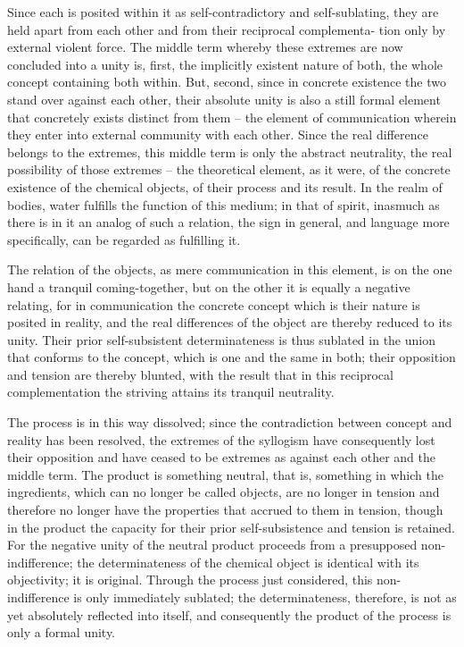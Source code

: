 Since each is posited within it as self-contradictory and self-sublating,
they are held apart from each other and from their reciprocal complementa-
tion only by external violent force. The middle term whereby these extremes
are now concluded into a unity is, first, the implicitly existent nature of both,
the whole concept containing both within. But, second, since in concrete
existence the two stand over against each other, their absolute unity is also a
still formal element that concretely exists distinct from them – the element
of communication wherein they enter into external community with each
other. Since the real difference belongs to the extremes, this middle term
is only the abstract neutrality, the real possibility of those extremes – the
theoretical element, as it were, of the concrete existence of the chemical
objects, of their process and its result. In the realm of bodies, water fulfills
the function of this medium; in that of spirit, inasmuch as there is in it an
analog of such a relation, the sign in general, and language more specifically,
can be regarded as fulfilling it.

The relation of the objects, as mere communication in this element, is
on the one hand a tranquil coming-together, but on the other it is equally
a negative relating, for in communication the concrete concept which is
their nature is posited in reality, and the real differences of the object are
thereby reduced to its unity. Their prior self-subsistent determinateness
is thus sublated in the union that conforms to the concept, which is one
and the same in both; their opposition and tension are thereby blunted,
with the result that in this reciprocal complementation the striving attains
its tranquil neutrality.

The process is in this way dissolved; since the contradiction between
concept and reality has been resolved, the extremes of the syllogism have
consequently lost their opposition and have ceased to be extremes as against
each other and the middle term. The product is something neutral, that
is, something in which the ingredients, which can no longer be called
objects, are no longer in tension and therefore no longer have the properties
that accrued to them in tension, though in the product the capacity for
their prior self-subsistence and tension is retained. For the negative unity
of the neutral product proceeds from a presupposed non-indifference; the
determinateness of the chemical object is identical with its objectivity; it
is original. Through the process just considered, this non-indifference is
only immediately sublated; the determinateness, therefore, is not as yet
absolutely reflected into itself, and consequently the product of the process
is only a formal unity.

